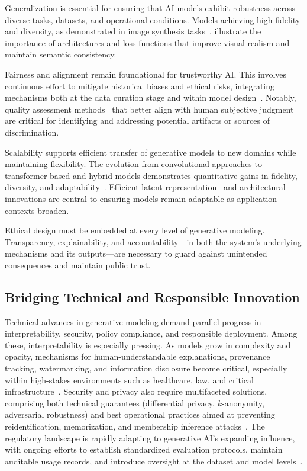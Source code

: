 \documentclass[sigconf]{acmart}
\begin{document}
Generalization is essential for ensuring that AI models exhibit robustness across diverse tasks, datasets, and operational conditions. Models achieving high fidelity and diversity, as demonstrated in image synthesis tasks~\cite{ref95,ref97,ref100,ref102}, illustrate the importance of architectures and loss functions that improve visual realism and maintain semantic consistency.

Fairness and alignment remain foundational for trustworthy AI. This involves continuous effort to mitigate historical biases and ethical risks, integrating mechanisms both at the data curation stage and within model design~\cite{ref98,ref99}. Notably, quality assessment methods~\cite{ref99} that better align with human subjective judgment are critical for identifying and addressing potential artifacts or sources of discrimination.

Scalability supports efficient transfer of generative models to new domains while maintaining flexibility. The evolution from convolutional approaches to transformer-based and hybrid models demonstrates quantitative gains in fidelity, diversity, and adaptability~\cite{ref75,ref92,ref100,ref102}. Efficient latent representation~\cite{ref100,ref102} and architectural innovations are central to ensuring models remain adaptable as application contexts broaden.

Ethical design must be embedded at every level of generative modeling. Transparency, explainability, and accountability---in both the system's underlying mechanisms and its outputs---are necessary to guard against unintended consequences and maintain public trust.

\subsection{Bridging Technical and Responsible Innovation}

Technical advances in generative modeling demand parallel progress in interpretability, security, policy compliance, and responsible deployment. Among these, interpretability is especially pressing. As models grow in complexity and opacity, mechanisms for human-understandable explanations, provenance tracking, watermarking, and information disclosure become critical, especially within high-stakes environments such as healthcare, law, and critical infrastructure~\cite{ref87,ref88,ref89}. Security and privacy also require multifaceted solutions, comprising both technical guarantees (differential privacy, $k$-anonymity, adversarial robustness) and best operational practices aimed at preventing reidentification, memorization, and membership inference attacks~\cite{ref88,ref89,ref91,ref99}. The regulatory landscape is rapidly adapting to generative AI's expanding influence, with ongoing efforts to establish standardized evaluation protocols, maintain auditable usage records, and introduce oversight at the dataset and model levels~\cite{ref82,ref87,ref89,ref90,ref91}.
\end{document}
